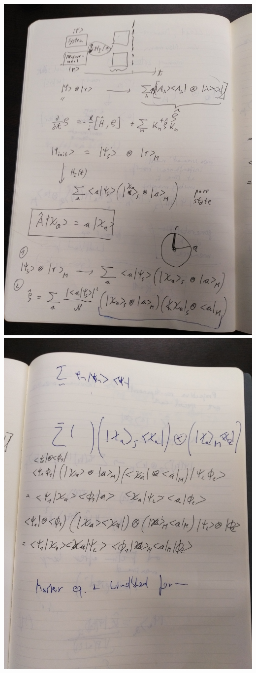 \clearpage\includegraphics[width=\linewidth]{img/pw/qmem/2.jpg}
\clearpage\includegraphics[width=\linewidth]{img/pw/qmem/3.jpg}
